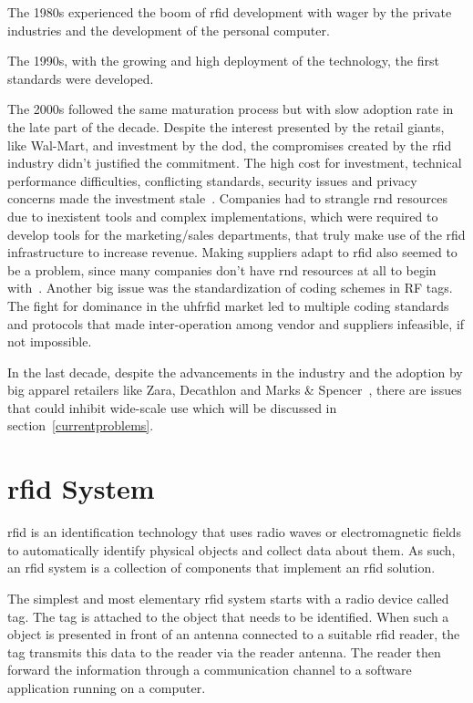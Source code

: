 The 1980s experienced the boom of \ac{rfid} development with wager by the private industries and the development of the personal computer.

The 1990s, with the growing and high deployment of the technology, the first standards were developed. 

The 2000s followed the same maturation process but with slow adoption rate in the late part of the decade. 
Despite the interest presented by the retail giants, like Wal-Mart, and investment by the \ac{dod}, the compromises created by the \ac{rfid} industry didn't justified the commitment. The high cost for investment, technical performance difficulties, conflicting standards, security issues and privacy concerns made the investment stale~\cite{RFIDAdoptionStalls}. 
Companies had to strangle \ac{rnd} resources due to inexistent tools and complex implementations, which were required to develop tools for the marketing/sales departments, that truly make use of the \ac{rfid} infrastructure to increase revenue.
Making suppliers adapt to \ac{rfid} also seemed to be a problem, since many companies don't have \ac{rnd} resources at all to begin with~\cite{gaudinSuppliersGainFailed2008}.
Another big issue was the standardization of coding schemes in RF tags. The fight for dominance in the \ac{uhfrfid} market led to multiple coding standards and protocols that made inter-operation among vendor and suppliers infeasible, if not impossible.

In the last decade, despite the advancements in the industry and the adoption by big apparel retailers like Zara, Decathlon and Marks \& Spencer~\cite{RFIDRetailApparel}, there are issues that could inhibit wide-scale use which will be discussed in section~\ref{currentproblems}.

\section{\ac{rfid} System}

\ac{rfid} is an identification technology that uses radio waves or electromagnetic fields to automatically identify physical objects and collect data about them.
As such, an \ac{rfid} system is a collection of components that implement an \ac{rfid} solution.

The simplest and most elementary \ac{rfid} system starts with a radio device called tag. The tag is attached to the object that needs to be identified. When such a object is presented in front of an antenna connected to a suitable \ac{rfid} reader, the tag transmits this data to the reader via the reader antenna. The reader then forward the information through a communication channel to a software application running on a computer.

